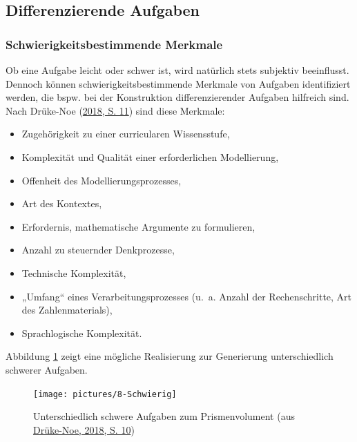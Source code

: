 \documentclass[
]{scrbook}
\providecommand{\tightlist}{%
  \setlength{\itemsep}{0pt}\setlength{\parskip}{0pt}}
\theoremstyle{definition}
\theoremstyle{definition}
\theoremstyle{definition}
\theoremstyle{definition}
\theoremstyle{remark}
\begin{document}
\hypertarget{differenzierende-aufgaben}{%
\subsection{Differenzierende Aufgaben}\label{differenzierende-aufgaben}}

\hypertarget{schwierigkeitsbestimmende-merkmale}{%
\subsubsection{Schwierigkeitsbestimmende Merkmale}\label{schwierigkeitsbestimmende-merkmale}}

Ob eine Aufgabe leicht oder schwer ist, wird natürlich stets subjektiv beeinflusst. Dennoch können schwierigkeitsbestimmende Merkmale von Aufgaben identifiziert werden, die bspw. bei der Konstruktion differenzierender Aufgaben hilfreich sind. Nach Drüke-Noe (\protect\hyperlink{ref-Druke-Noe2018}{2018, S. 11}) sind diese Merkmale:

\begin{itemize}
\tightlist
\item
  Zugehörigkeit zu einer curricularen Wissensstufe,
\item
  Komplexität und Qualität einer erforderlichen Modellierung,
\item
  Offenheit des Modellierungsprozesses,
\item
  Art des Kontextes,
\item
  Erfordernis, mathematische Argumente zu formulieren,
\item
  Anzahl zu steuernder Denkprozesse,
\item
  Technische Komplexität,
\item
  „Umfang`` eines Verarbeitungsprozesses (u.~a. Anzahl der Rechenschritte, Art des Zahlenmaterials),
\item
  Sprachlogische Komplexität.
\end{itemize}

Abbildung \ref{fig:Schwierig} zeigt eine mögliche Realisierung zur Generierung unterschiedlich schwerer Aufgaben.



\begin{figure}

{\centering \texttt{[image: pictures/8-Schwierig]} 

}

\caption{Unterschiedlich schwere Aufgaben zum Prismenvolument (aus \protect\hyperlink{ref-Druke-Noe2018}{Drüke-Noe, 2018, S. 10})}\label{fig:Schwierig}
\end{figure}
\end{document}
